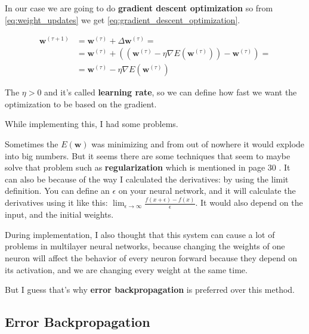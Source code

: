 \documentclass[a4paper,12pt]{article}
\theoremstyle{mytheoremstyle}
\theoremstyle{mytheoremstyle}
\theoremstyle{myproblemstyle}
\begin{document}
    In our case we are going to do \textbf{gradient descent optimization} so
    from \eqref{eq:weight_updates} we get
    \eqref{eq:gradient_descent_optimization}.

    \begin{equation}
        \begin{split}
            \mathbf{w}^{\left( \tau + 1 \right)} & = \mathbf{w}^{\left( \tau \right)} + \Delta \mathbf{w}^{\left( \tau \right)} = \\
            & = \mathbf{w}^{\left( \tau \right)} + \left( \left( \mathbf{w}^{\left( \tau \right)} - \eta \nabla E \left( \mathbf{w}^{\left( \tau \right)} \right) \right) - \mathbf{w}^{\left( \tau \right)} \right) = \\
            & = \mathbf{w}^{\left( \tau \right)} - \eta \nabla E \left( \mathbf{w}^{\left( \tau \right)} \right)
        \end{split}
        \label{eq:gradient_descent_optimization}
    \end{equation}

    The $ \eta > 0 $ and it's called \textbf{learning rate}, so we can define
    how fast we want the optimization to be based on the gradient.

    While implementing this, I had some problems.

    Sometimes the $ E \left( \mathbf{w} \right) $ was minimizing and from out of nowhere it
    would explode into big numbers. But it seems there are some techniques that
    seem to maybe solve that problem such as \textbf{regularization} which is
    mentioned in page 30 \cite{bishop}. It can also be because of the way I
    calculated the derivatives: by using the limit definition. You can define
    an $ \epsilon $ on your neural network, and it will calculate the
    derivatives using it like this: $ \lim_{\epsilon\to\infty} \frac{f(x +
    \epsilon) - f(x)}{\epsilon} $. It would also depend on the input, and the
    initial weights.

    During implementation, I also thought that this system can cause a lot of
    problems in multilayer neural networks, because changing the weights of one
    neuron will affect the behavior of every neuron forward because they depend
    on its activation, and we are changing every weight at the same time.

    But I guess that's why \textbf{error backpropagation} is preferred over
    this method.

    \subsection{Error Backpropagation}
\end{document}
